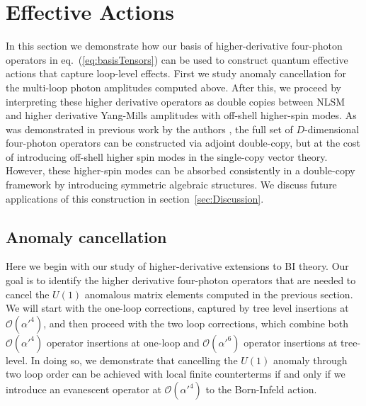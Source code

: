 \documentclass[12pt,letter]{article}
\def\sec#1{section~\ref{#1}}
\def\eqn#1{eq.~(\ref{#1})}
\begin{document}
\section{Effective Actions} \label{sec:Actions}
In this section we demonstrate how our basis of higher-derivative four-photon operators in \eqn{eq:basisTensors} can be used to construct quantum effective actions that capture loop-level effects. First we study anomaly cancellation for the multi-loop photon amplitudes computed above. After this, we proceed by interpreting these higher derivative operators as double copies between NLSM and higher derivative Yang-Mills amplitudes with off-shell higher-spin modes. As was demonstrated in previous work by the authors \cite{Carrasco:2022jxn}, the full set of $D$-dimensional four-photon operators can be constructed via adjoint double-copy, but at the cost of introducing off-shell higher spin modes in the single-copy vector theory. However, these higher-spin modes can be absorbed consistently in a double-copy framework by introducing symmetric algebraic structures. We discuss future applications of this construction in \sec{sec:Discussion}.

\subsection{Anomaly cancellation}\label{sec:Anomalies}
Here we begin with our study of higher-derivative extensions to BI theory. Our goal is to identify the higher derivative four-photon operators that are needed to cancel the $U(1)$ anomalous matrix elements computed in the previous section. We will start with the one-loop corrections, captured by tree level insertions at $\mathcal{O}(\alpha'^4)$, and then proceed with the two loop corrections, which combine both $\mathcal{O}(\alpha'^4)$ operator insertions at one-loop and $\mathcal{O}(\alpha'^6)$ operator insertions at tree-level. In doing so, we demonstrate that cancelling the $U(1)$ anomaly through two loop order can be achieved with local finite counterterms if and only if we introduce an evanescent operator at $\mathcal{O}(\alpha'^4)$ to the Born-Infeld action. 
\end{document}
